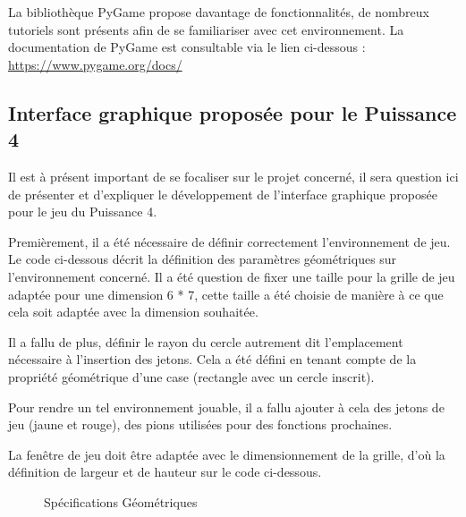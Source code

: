 \documentclass[a4paper]{article}
\begin{document}
La bibliothèque PyGame propose davantage de fonctionnalités, de nombreux tutoriels sont présents afin de se familiariser avec cet environnement.
La documentation de PyGame est consultable via le lien ci-dessous : \url{https://www.pygame.org/docs/}

\newpage

\subsection{Interface graphique proposée pour le Puissance 4}

Il est à présent important de se focaliser sur le projet concerné, il sera question ici de présenter et d'expliquer le développement de l'interface graphique proposée pour le jeu du Puissance 4.

Premièrement, il a été nécessaire de définir correctement l'environnement de jeu. Le code ci-dessous décrit la définition des paramètres géométriques sur l'environnement concerné.
Il a été question de fixer une taille pour la grille de jeu adaptée pour une dimension 6 * 7, cette taille a été choisie de manière à ce que cela soit adaptée avec la dimension souhaitée.

Il a fallu de plus, définir le rayon du cercle autrement dit l'emplacement nécessaire à l'insertion des jetons. Cela a été défini en tenant compte de la propriété géométrique d'une case (rectangle avec un cercle inscrit).

Pour rendre un tel environnement jouable, il a fallu ajouter à cela des jetons de jeu (jaune et rouge), des pions utilisées pour des fonctions prochaines.

La fenêtre de jeu doit être adaptée avec le dimensionnement de la grille, d'où la définition de largeur et de hauteur sur le code ci-dessous.



\begin{figure}[!h] 
\centering
{}
\caption{Spécifications Géométriques} 
\end{figure} 
\end{document}
